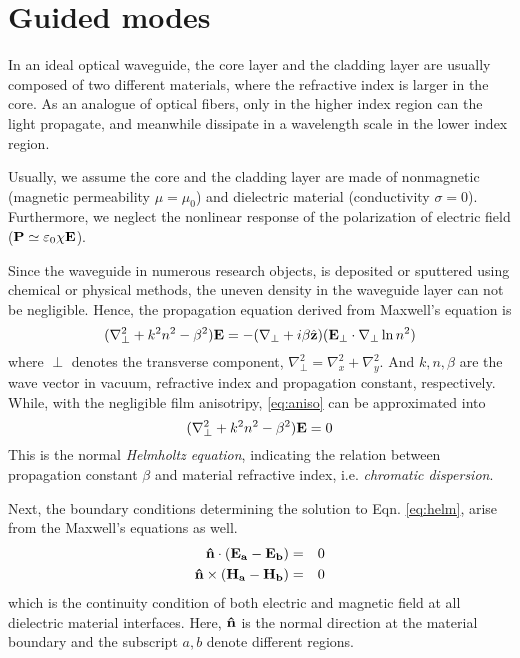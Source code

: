 \documentclass[final]{kuee_en}
\newcommand{\nosymbol}{}
\begin{document}
\section{Guided modes}

In an ideal optical waveguide, the core layer and the cladding layer are usually composed of two different materials, where the refractive index is larger in the core. As an analogue of optical fibers, only in the higher index region can the light propagate, and meanwhile dissipate in a wavelength scale in the lower index region.

Usually, we assume the core and the cladding layer are made of nonmagnetic (magnetic permeability $\mu = \mu_0$) and dielectric material (conductivity $\sigma = 0$). Furthermore, we neglect the nonlinear response of the polarization of electric field ($\vb{P} \simeq \varepsilon_0 \chi \vb{E}$).

Since the waveguide in numerous research objects, is deposited or sputtered using chemical or physical methods, the uneven density in the waveguide layer can not be negligible. Hence, the propagation equation derived from Maxwell's equation is
\begin{equation}\label{eq:aniso}
  (\nabla_{\perp}^2 + k^2 n^2 - \beta^2) \vb{E} = - (\nabla_{\perp} + i
  \beta \hat{\vb{z}}) (\vb{E_{\perp}} \nosymbol \cdot \nabla_{\perp} \ln
  n^2)
\end{equation}
where $\perp$ denotes the transverse component, $\nabla_{\perp}^2 = \nabla_x^2 + \nabla_y^2$. And $k, n, \beta$ are the wave vector in vacuum, refractive index and propagation constant, respectively. While, with the negligible film anisotripy, \autoref{eq:aniso} can be approximated into
\begin{equation}\label{eq:helm}
  (\nabla_{\perp}^2 + k^2 n^2 - \beta^2) \vb{E} = 0
\end{equation}
This is the normal \textit{Helmholtz equation}, indicating the relation between propagation constant $\beta$ and material refractive index, i.e. \textit{chromatic dispersion}.

Next, the boundary conditions determining the solution to Eqn. \ref{eq:helm}, arise from the Maxwell's equations as well.
\begin{eqnarray*}%
  \vb{\hat{n}} \cdot (\vb{E_a - E_b}) & = & 0 \\
  \vb{\hat{n}} \times (\vb{\vb{H_a} - H_{\vb{b}}}) & = & 0
\end{eqnarray*}
which is the continuity condition of both electric and magnetic field at all dielectric material interfaces. Here, $\vb{\hat{n}}$ is the normal direction at the material boundary and the subscript $a, b$ denote different regions.
\end{document}
